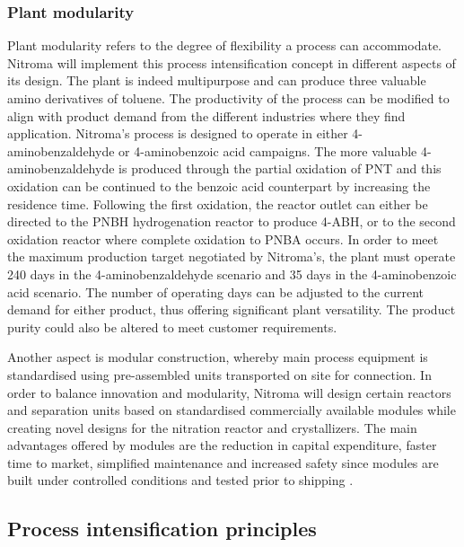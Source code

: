 \subsubsection{Plant modularity} 

Plant modularity refers to the degree of flexibility a process can accommodate. Nitroma will implement this process intensification concept in different aspects of its design. The plant is indeed multipurpose and can produce three valuable amino derivatives of toluene. The productivity of the process can be modified to align with product demand from the different industries where they find application. Nitroma's process is designed to operate in either 4-aminobenzaldehyde or 4-aminobenzoic acid campaigns. The more valuable 4-aminobenzaldehyde is produced through the partial oxidation of PNT and this oxidation can be continued to the benzoic acid counterpart by increasing the residence time. Following the first oxidation, the reactor outlet can either be directed to the PNBH hydrogenation reactor to produce 4-ABH, or to the second oxidation reactor where complete oxidation to PNBA occurs. In order to meet the maximum production target negotiated by Nitroma's, the plant must operate 240 days in the 4-aminobenzaldehyde scenario and 35 days in the 4-aminobenzoic acid scenario. The number of operating days can be adjusted to the current demand for either product, thus offering significant plant versatility. The product purity could also be altered to meet customer requirements.

Another aspect is modular construction, whereby main process equipment is standardised using pre-assembled units transported on site for connection. In order to balance innovation and modularity, Nitroma will design certain reactors and separation units based on standardised commercially available modules while creating novel designs for the nitration reactor and crystallizers. The main advantages offered by modules are the reduction in capital expenditure, faster time to market, simplified maintenance and increased safety since modules are built under controlled conditions and tested prior to shipping \cite{baldea_modular_2017}.

\subsection{Process intensification principles}

